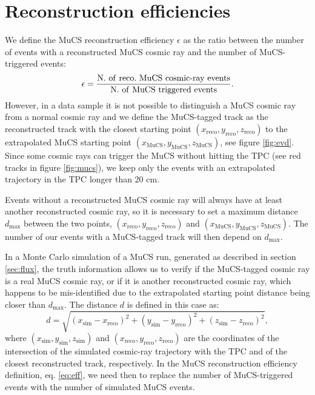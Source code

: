 \documentclass[a4paper]{scrartcl}
\def\myhyphen{{\hbox{-}}}
\begin{document}
\section{Reconstruction efficiencies}\label{sec:reco}

We define the MuCS reconstruction efficiency $\epsilon$ as the ratio between the number of events with a reconstructed MuCS cosmic ray and the number of MuCS-triggered events:
\begin{equation}\label{eq:eff}
  \epsilon = \frac{\mathrm{N.~of~reco.~MuCS~cosmic\myhyphen ray~events}}{\mathrm{N.~of~MuCS~triggered~events}}.
\end{equation}
However, in a data sample it is not possible to distinguish a MuCS cosmic ray from a normal cosmic ray and we define the MuCS-tagged track as the reconstructed track with the closest starting point $(x_{\mathrm{reco}},y_{\mathrm{reco}},z_{\mathrm{reco}})$ to the extrapolated MuCS starting point $(x_{\mathrm{MuCS}},y_{\mathrm{MuCS}},z_{\mathrm{MuCS}})$, see figure \ref{fig:evd}. Since some cosmic rays can trigger the MuCS without hitting the TPC (see red tracks in figure \ref{fig:mucs}), we keep only the events with an extrapolated trajectory in the TPC longer than 20 cm.

Events without a reconstructed MuCS cosmic ray will always have at least another reconstructed cosmic ray, so it is necessary to set a maximum distance $d_{\mathrm{max}}$ between the two points, $(x_{\mathrm{reco}},y_{\mathrm{reco}},z_{\mathrm{reco}})$ and $(x_{\mathrm{MuCS}},y_{\mathrm{MuCS}},z_{\mathrm{MuCS}})$. The number of our events with a MuCS-tagged track will then depend on $d_{\mathrm{max}}$.

In a Monte Carlo simulation of a MuCS run, generated as described in section \ref{sec:flux}, the truth information allows us to verify if the MuCS-tagged cosmic ray is a real MuCS cosmic ray, or if it is another reconstructed cosmic ray, which happens to be mis-identified due to the extrapolated starting point distance being closer than $d_{\mathrm{max}}$.
The distance $d$ is defined in this case as:
\begin{equation}\label{eq:d_mc}
d = \sqrt{(x_{\mathrm{sim}}-x_{\mathrm{reco}})^2+(y_{\mathrm{sim}}-y_{\mathrm{reco}})^2+(z_{\mathrm{sim}}-z_{\mathrm{reco}})^2},
\end{equation}
where $(x_{\mathrm{sim}},y_{\mathrm{sim}},z_{\mathrm{sim}})$ and $(x_{\mathrm{reco}},y_{\mathrm{reco}},z_{\mathrm{reco}})$ are the coordinates of the intersection of the simulated cosmic-ray trajectory with the TPC and of the closest reconstructed track, respectively. In the MuCS reconstruction efficiency definition, eq. \eqref{eq:eff}, we need then to replace the number of MuCS-triggered events with the number of simulated MuCS events.
\end{document}
